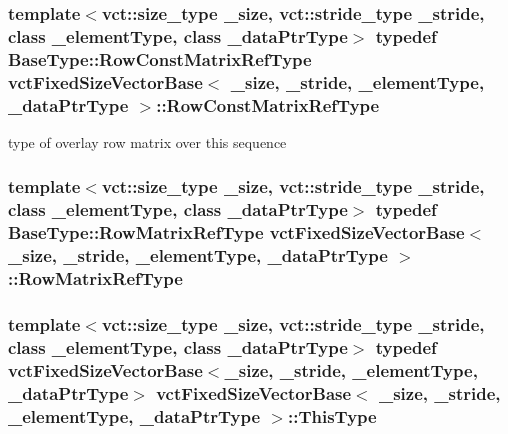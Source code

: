 \subsubsection[{Row\+Const\+Matrix\+Ref\+Type}]{\setlength{\rightskip}{0pt plus 5cm}template$<$vct\+::size\+\_\+type \+\_\+size, vct\+::stride\+\_\+type \+\_\+stride, class \+\_\+element\+Type, class \+\_\+data\+Ptr\+Type$>$ typedef {\bf Base\+Type\+::\+Row\+Const\+Matrix\+Ref\+Type} {\bf vct\+Fixed\+Size\+Vector\+Base}$<$ \+\_\+size, \+\_\+stride, \+\_\+element\+Type, \+\_\+data\+Ptr\+Type $>$\+::{\bf Row\+Const\+Matrix\+Ref\+Type}}\label{classvct_fixed_size_vector_base_a8f1918b51b34a75973890b1b898b1991}
type of overlay row matrix over this sequence \hypertarget{classvct_fixed_size_vector_base_a880e7f696c2064b9e0339290e6a92c3f}{}
\subsubsection[{Row\+Matrix\+Ref\+Type}]{\setlength{\rightskip}{0pt plus 5cm}template$<$vct\+::size\+\_\+type \+\_\+size, vct\+::stride\+\_\+type \+\_\+stride, class \+\_\+element\+Type, class \+\_\+data\+Ptr\+Type$>$ typedef {\bf Base\+Type\+::\+Row\+Matrix\+Ref\+Type} {\bf vct\+Fixed\+Size\+Vector\+Base}$<$ \+\_\+size, \+\_\+stride, \+\_\+element\+Type, \+\_\+data\+Ptr\+Type $>$\+::{\bf Row\+Matrix\+Ref\+Type}}\label{classvct_fixed_size_vector_base_a880e7f696c2064b9e0339290e6a92c3f}
\hypertarget{classvct_fixed_size_vector_base_a44798eb609f1e32d7fa8f1ac63d3f894}{}
\subsubsection[{This\+Type}]{\setlength{\rightskip}{0pt plus 5cm}template$<$vct\+::size\+\_\+type \+\_\+size, vct\+::stride\+\_\+type \+\_\+stride, class \+\_\+element\+Type, class \+\_\+data\+Ptr\+Type$>$ typedef {\bf vct\+Fixed\+Size\+Vector\+Base}$<$\+\_\+size, \+\_\+stride, \+\_\+element\+Type, \+\_\+data\+Ptr\+Type$>$ {\bf vct\+Fixed\+Size\+Vector\+Base}$<$ \+\_\+size, \+\_\+stride, \+\_\+element\+Type, \+\_\+data\+Ptr\+Type $>$\+::{\bf This\+Type}}\label{classvct_fixed_size_vector_base_a44798eb609f1e32d7fa8f1ac63d3f894}
\hypertarget{classvct_fixed_size_vector_base_ad6d90437534a054c5beb020f588b0b02}{}
